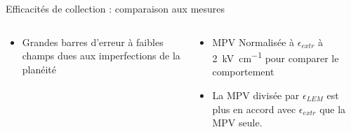 \begin{frame}{Efficacités de collection : comparaison aux mesures}
\begin{scriptsize}
\begin{columns}
\begin{column}{0.5\textwidth}
\begin{itemize}
                        \item Grandes barres d'erreur à faibles champs dues aux imperfections de la planéité
                    \end{itemize}
                \end{column}
                \begin{column}{0.5\textwidth}
                    \begin{itemize}
                        \item MPV Normalisée à $\epsilon_{extr}$ à \SI{2}{\kilo\volt\per\centi\meter} pour comparer le comportement
                        \item La MPV divisée par  $\epsilon_{LEM}$ est plus en accord avec $\epsilon_{extr}$ que la MPV seule.
                    \end{itemize}
                \end{column}
            \end{columns}
        \end{scriptsize}
    \end{frame}

